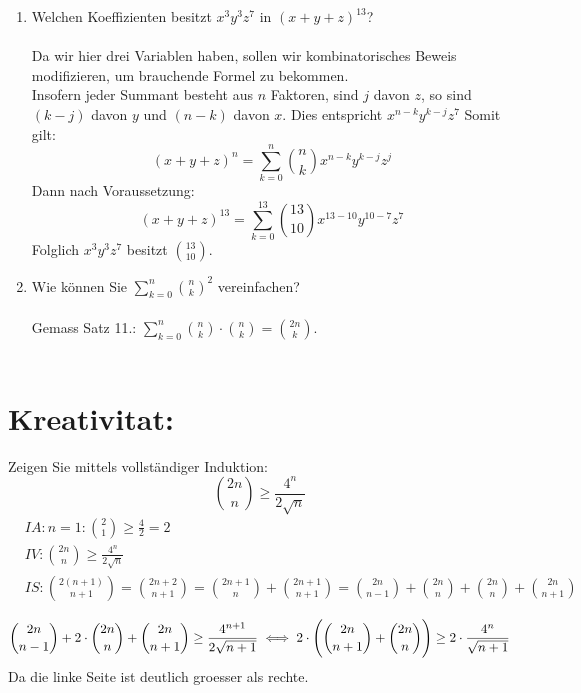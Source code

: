 \begin{enumerate}[label=(\alph*)]
        \item Welchen Koeffizienten besitzt $x^3y^3z^7$ in $(x+y+z)^{13}$?\\\\
        Da wir hier drei Variablen haben, sollen wir kombinatorisches Beweis modifizieren, um 
        brauchende Formel zu bekommen.\\
        Insofern jeder Summant besteht aus $n$ Faktoren, sind $j$ davon $z$, so sind $(k-j)$ davon $y$ 
        und $(n-k)$ davon $x$. Dies entspricht $x^{n-k}y^{k-j}z^7$
        Somit gilt:
        \[(x+y+z)^{n} = \sum_{k=0}^{n} \binom{n}{k}x^{n-k}y^{k-j}z^j\]
        Dann nach Voraussetzung: 
        \[(x+y+z)^{13} = \sum_{k=0}^{13} \binom{13}{10}x^{13-10}y^{10-7}z^7\]
        Folglich $x^3y^3z^7$ besitzt $\binom{13}{10}$.

        \item Wie können Sie $\sum_{k=0}^n \binom{n}{k}^2$ vereinfachen?\\\\
        Gemass Satz 11.: $\sum_{k=0}^n \binom{n}{k}\cdot\binom{n}{k} = \binom{2n}{k}$.\\\\
    \end{enumerate}
    
    \section*{Kreativitat:} 
    Zeigen Sie mittels vollständiger Induktion:
    \[\binom{2n}{n}\geq \frac{4^n}{2\sqrt n}\]
    \begin{align*}
            &IA: n=1: \binom{2}{1}\geq \frac{4}{2} = 2\\ %
            &IV: \binom{2n}{n}\geq \frac{4^n}{2\sqrt n}\\
            &IS: \binom{2(n+1)}{n+1}=\binom{2n+2}{n+1}
            = \binom{2n+1}{n} + \binom{2n+1}{n+1}
            = \binom{2n}{n-1} + \binom{2n}{n} + \binom{2n}{n} + \binom{2n}{n+1}\\
    \end{align*}
    \[\binom{2n}{n-1} + 2\cdot\binom{2n}{n} + \binom{2n}{n+1} \geq \frac{4^{n+1}}{2\sqrt {n+1}}\\
            \iff 2\cdot\Bigg(\binom{2n}{n+1} + \binom{2n}{n}\Bigg) \geq 2\cdot\frac{4^n}{\sqrt {n+1}}\\\]
            Da die linke Seite ist deutlich groesser als rechte.
